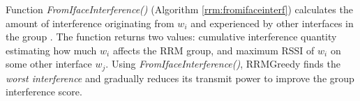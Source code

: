 
Function \textit{FromIfaceInterference()} (Algorithm \ref{rrm:fromifaceinterf}) calculates the amount of interference originating from $w_i$ and experienced by other interfaces in the group \rrmG. The function returns two values: cumulative interference quantity estimating how much $w_i$ affects the RRM group, and maximum RSSI of $w_i$ on some other interface $w_j$. Using \textit{FromIfaceInterference()}, RRMGreedy finds the \textit{worst interference} and gradually reduces its transmit power to improve the group interference score.

\newcommand{\rrmIface}{interface}
\newcommand{\rrmScandata}{scandata}

